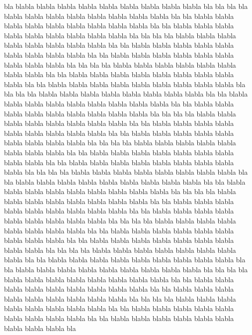 \documentclass[12pt,a4paper,english]{book}
\begin{document}
bla blabla blabla blabla blabla blabla blabla blabla blabla blabla bla
bla bla
bla blabla blabla blabla blabla blabla blabla blabla blabla bla
bla blabla blabla blabla blabla blabla blabla blabla blabla blabla bla
bla blabla blabla blabla blabla blabla blabla blabla blabla blabla bla
bla bla
bla blabla blabla blabla blabla blabla blabla blabla blabla bla
bla blabla blabla blabla blabla blabla blabla blabla blabla blabla bla
bla blabla blabla blabla blabla blabla blabla blabla blabla blabla bla
bla bla
bla blabla blabla blabla blabla blabla blabla blabla blabla bla
bla blabla blabla blabla blabla blabla blabla blabla blabla blabla bla
bla blabla blabla blabla blabla blabla blabla blabla blabla blabla bla
bla bla
bla blabla blabla blabla blabla blabla blabla blabla blabla bla
bla blabla blabla blabla blabla blabla blabla blabla blabla blabla bla
bla blabla blabla blabla blabla blabla blabla blabla blabla blabla bla
bla bla
bla blabla blabla blabla blabla blabla blabla blabla blabla bla
bla blabla blabla blabla blabla blabla blabla blabla blabla blabla bla
bla blabla blabla blabla blabla blabla blabla blabla blabla blabla bla
bla bla
bla blabla blabla blabla blabla blabla blabla blabla blabla bla
bla blabla blabla blabla blabla blabla blabla blabla blabla blabla bla
bla blabla blabla blabla blabla blabla blabla blabla blabla blabla bla
bla bla
bla blabla blabla blabla blabla blabla blabla blabla blabla bla
bla blabla blabla blabla blabla blabla blabla blabla blabla blabla bla
bla blabla blabla blabla blabla blabla blabla blabla blabla blabla bla
bla bla
bla blabla blabla blabla blabla blabla blabla blabla blabla bla
bla blabla blabla blabla blabla blabla blabla blabla blabla blabla bla
bla blabla blabla blabla blabla blabla blabla blabla blabla blabla bla
bla bla
bla blabla blabla blabla blabla blabla blabla blabla blabla bla
bla blabla blabla blabla blabla blabla blabla blabla blabla blabla bla
bla blabla blabla blabla blabla blabla blabla blabla blabla blabla bla
bla bla
bla blabla blabla blabla blabla blabla blabla blabla blabla bla
bla blabla blabla blabla blabla blabla blabla blabla blabla blabla bla
bla blabla blabla blabla blabla blabla blabla blabla blabla blabla bla
bla bla
bla blabla blabla blabla blabla blabla blabla blabla blabla bla
bla blabla blabla blabla blabla blabla blabla blabla blabla blabla bla
bla blabla blabla blabla blabla blabla blabla blabla blabla blabla bla
bla bla
bla blabla blabla blabla blabla blabla blabla blabla blabla bla
bla blabla blabla blabla blabla blabla blabla blabla blabla blabla bla
bla blabla blabla blabla blabla blabla blabla blabla blabla blabla bla
\end{document}
